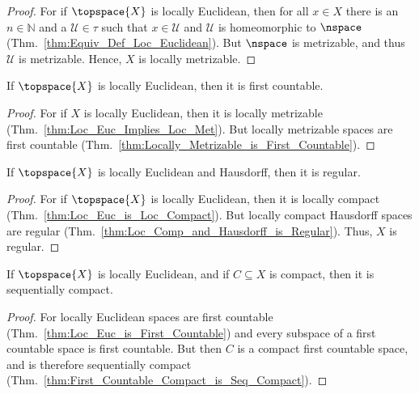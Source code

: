 \documentclass{article}                                                        %
\begin{document}
            \begin{proof}
                For if $\topspace{X}$ is locally Euclidean, then for all $x\in{X}$
                there is an $n\in\mathbb{N}$ and a $\mathcal{U}\in\tau$ such that
                $x\in\mathcal{U}$ and $\mathcal{U}$ is homeomorphic to
                $\nspace$ (Thm.~\ref{thm:Equiv_Def_Loc_Euclidean}). But
                $\nspace$ is metrizable, and thus $\mathcal{U}$ is metrizable.
                Hence, $X$ is locally metrizable.
            \end{proof}
            \begin{theorem}
                \label{thm:Loc_Euc_is_First_Countable}%
                If $\topspace{X}$ is locally Euclidean, then it is first
                countable.
            \end{theorem}
            \begin{proof}
                For if $X$ is locally Euclidean, then it is locally metrizable
                (Thm.~\ref{thm:Loc_Euc_Implies_Loc_Met}). But locally
                metrizable spaces are first countable
                (Thm.~\ref{thm:Locally_Metrizable_is_First_Countable}).
            \end{proof}
            \begin{theorem}
                \label{thm:Loc_Euc_Haus_is_Regular}%
                If $\topspace{X}$ is locally Euclidean and Hausdorff, then it is
                regular.
            \end{theorem}
            \begin{proof}
                For if $\topspace{X}$ is locally Euclidean, then it is locally
                compact (Thm.~\ref{thm:Loc_Euc_is_Loc_Compact}). But locally
                compact Hausdorff spaces are regular
                (Thm.~\ref{thm:Loc_Comp_and_Hausdorff_is_Regular}). Thus,
                $X$ is regular.
            \end{proof}
            \begin{theorem}
                \label{thm:Comp_Sub_of_Loc_Euc_is_Seq_Comp}%
                If $\topspace{X}$ is locally Euclidean, and if $C\subseteq{X}$
                is compact, then it is sequentially compact.
            \end{theorem}
            \begin{proof}
                For locally Euclidean spaces are first countable
                (Thm.~\ref{thm:Loc_Euc_is_First_Countable}) and every subspace
                of a first countable space is first countable. But then $C$ is
                a compact first countable space, and is therefore sequentially
                compact (Thm.~\ref{thm:First_Countable_Compact_is_Seq_Compact}).
            \end{proof}
\end{document}
